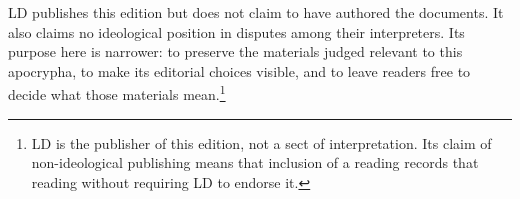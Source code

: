 LD publishes this edition but does not claim to have authored the documents.
It also claims no ideological position in disputes among their interpreters.
Its purpose here is narrower: to preserve the materials judged relevant to
this apocrypha, to make its editorial choices visible, and to leave readers
free to decide what those materials mean.\footnote{LD is the publisher of this
edition, not a sect of interpretation.  Its claim of non-ideological
publishing means that inclusion of a reading records that reading without
requiring LD to endorse it.}

\endgroup


\label{gen-apoc:infinite-j-est}

